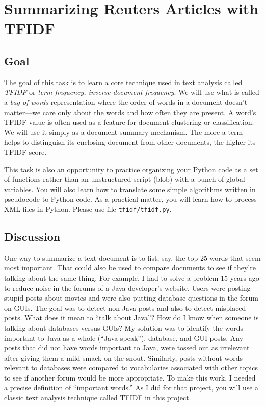 \chapter{Summarizing Reuters Articles with TFIDF}

\section{Goal}

\begin{fullwidth}

The goal of this task is to learn a core technique used in text analysis called {\em TFIDF} or {\em term frequency, inverse document frequency}.  We will use what is called a {\em bag-of-words} representation where the order of words in a document doesn't matter---we care only about the words and how often they are present. A word's TFIDF value is often used as a feature for document clustering or classification. We will use it simply as a document summary mechanism. The more a term helps to distinguish its enclosing document from other documents, the higher its TFIDF score.

This task is also an opportunity to practice organizing your Python code as a set of functions rather than an unstructured script (blob) with a bunch of global variables. You will also learn how to translate some simple algorithms written in pseudocode to Python code. As a practical matter, you will learn how to process XML files in Python.  Please use file {\tt tfidf/tfidf.py}.

\section{Discussion}

One way to summarize a text document is to list, say, the top 25 words that seem most important. That could also be used to compare documents to see if they're talking about the same thing. For example, I had to solve a problem 15 years ago to reduce noise in the forums of a Java developer's website.  Users were posting stupid posts about movies and were also putting database questions in the forum on GUIs. The goal was to detect non-Java posts and also to detect misplaced posts. What does it mean to ``talk about Java''?  How do I know when someone is talking about databases versus GUIs? My solution was to identify the words important to Java as a whole (``Java-speak''), database, and GUI posts.  Any posts that did not have words important to Java, were tossed out as irrelevant after giving them a mild smack on the snout. Similarly, posts without words relevant to databases were compared to vocabularies associated with other topics to see if another forum would be more appropriate. To make this work, I needed a precise definition of ``important words.'' As I did for that project, you will use a classic   text analysis technique called TFIDF in this project.


\end{fullwidth}
